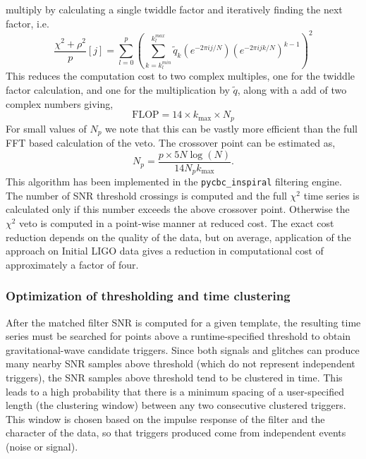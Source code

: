 multiply by calculating a single twiddle factor and iteratively finding the next factor, i.e.
\begin{equation}
\frac{\chi^2 + \rho^2}{p}[j] = \sum_{l=0}^{p}\left(\sum_{k=k^{min}_l}^{k^{max}_l}\tilde{q}_k (e^{-2\pi ij/N}) (e^{-2\pi ijk/N})^{k-1}\right)^2                                        
\end{equation}
This reduces the computation cost to two complex multiples, one for the twiddle factor calculation,
and one for the multiplication by $\tilde{q}$, along with a add of two complex numbers giving,
\begin{equation}
 \textrm{FLOP} = 14 \times k_\mathrm{max} \times N_p
\end{equation}
For small values of $N_p$ we note that this can be vastly more efficient than the full FFT based
calculation of the veto. The crossover point can be estimated as,
\begin{equation}
N_p = \frac{p \times 5N\log(N)}{14 N_p k_\mathrm{max}}.
\end{equation}
This algorithm has been implemented in the \texttt{pycbc\_inspiral} filtering
engine. The
number of SNR threshold crossings is computed and the full $\chi^2$ time
series is calculated only if this number exceeds the above crossover point.
Otherwise the $\chi^2$ veto is computed in a point-wise manner at reduced
cost. The exact cost reduction depends on the quality of the data, but on
average, application of the approach on Initial LIGO data gives a reduction in computational cost of approximately a factor
of four.

\vspace*{-10pt}
\subsubsection{Optimization of thresholding and time clustering}
\vspace*{-05pt}
\label{sec:opt-thresh}

After the matched filter SNR is computed for a given template, 
the resulting time
series must be searched for points above a runtime-specified threshold to
obtain gravitational-wave candidate triggers.  Since both signals and glitches can produce
many nearby SNR samples above threshold (which do not represent independent
triggers), the SNR samples above threshold tend to be clustered in time. This leads to a high probability
that there is a minimum spacing of a user-specified length (the
clustering window) between any two consecutive clustered triggers. This window
is chosen based on the impulse response of the filter and the character of the
data, so that triggers produced come from independent events (noise or signal).

